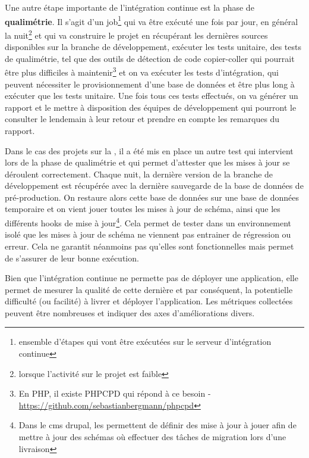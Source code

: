 Une autre étape importante de l'intégration continue est la phase de \textbf{qualimétrie}. Il s'agit d'un job\footnote{ensemble d'étapes qui vont être exécutées sur le serveur d'intégration continue} qui va être exécuté une fois par jour, en général la nuit\footnote{lorsque l'activité sur le projet est faible} et qui va construire le projet en récupérant les dernières sources disponibles sur la branche de développement, exécuter les tests unitaire, des tests de qualimétrie, tel que des outils de détection de code  copier-coller qui pourrait être plus difficiles à maintenir\footnote{En \gls{PHP}, il existe PHPCPD qui répond à ce besoin - \url{https://github.com/sebastianbergmann/phpcpd}} et on va exécuter les tests d'intégration, qui peuvent nécessiter le provisionnement d'une base de données et être plus long à exécuter que les tests unitaire. Une fois tous ces tests effectués, on va générer un rapport et le mettre à disposition des équipes de développement qui pourront le consulter le lendemain à leur retour et prendre en compte les remarques du rapport. 

Dans le cas des projets sur la \naq{}, il a été mis en place un autre test qui intervient lors de la phase de qualimétrie et qui permet d'attester que les mises à jour se déroulent correctement. Chaque nuit, la dernière version de la branche de développement est récupérée avec la dernière sauvegarde de la base de données de pré-production. On restaure alors cette base de données sur une base de données temporaire et on vient jouer toutes les mises à jour de schéma, ainsi que les différents hooks de mise à jour\footnote{Dans le \gls{cms} \gls{drupal}, les  permettent de définir des mise à jour à jouer afin de mettre à jour des schémas où effectuer des tâches de migration lors d'une livraison}. Cela permet de tester dans un environnement isolé que les mises à jour de schéma ne viennent pas entrainer de régression ou erreur. Cela ne garantit néanmoins pas qu'elles sont fonctionnelles mais permet de s'assurer de leur bonne exécution.

Bien que l'intégration continue ne permette pas de déployer une application, elle permet de mesurer la qualité de cette dernière et par conséquent, la potentielle difficulté (ou facilité) à livrer et déployer l'application. Les métriques collectées peuvent être nombreuses et indiquer des axes d'améliorations divers.

